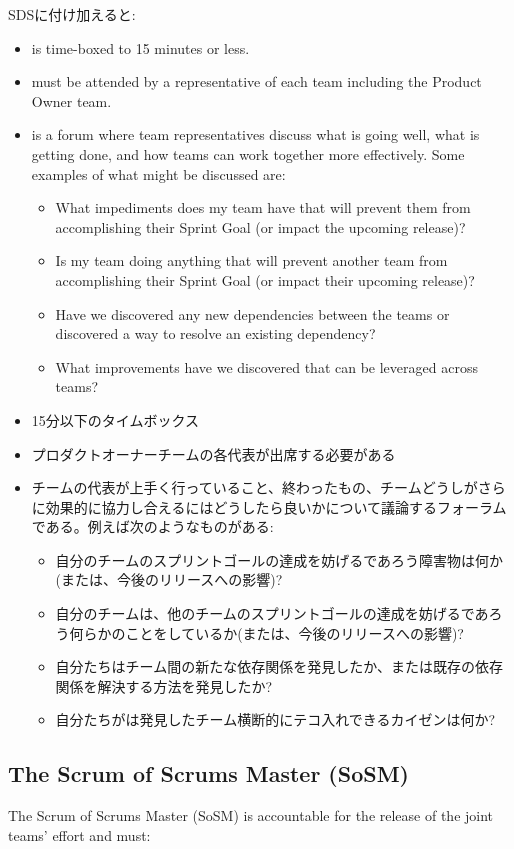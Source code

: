 \documentclass[12pt,a4paper,parskip=full]{scrartcl}
\begin{document}
SDSに付け加えると:
\begin{itemize}
\item is time-boxed to 15 minutes or less.
\item must be attended by a representative of each team including the Product Owner team.
\item is a forum where team representatives discuss what is going well, what is getting done, and how teams can work together more effectively. Some examples of what might be discussed are:
\begin{itemize}
\item What impediments does my team have that will prevent them from
accomplishing their Sprint Goal (or impact the upcoming release)?
\item Is my team doing anything that will prevent another team from
accomplishing their Sprint Goal (or impact their upcoming release)?
\item Have we discovered any new dependencies between the teams or
discovered a way to resolve an existing dependency?
\item What improvements have we discovered that can be leveraged across teams?
\end{itemize}
\end{itemize}
\fi
\begin{itemize}
\item 15分以下のタイムボックス
\item プロダクトオーナーチームの各代表が出席する必要がある
\item チームの代表が上手く行っていること、終わったもの、チームどうしがさらに効果的に協力し合えるにはどうしたら良いかについて議論するフォーラムである。例えば次のようなものがある:
\begin{itemize}
\item 自分のチームのスプリントゴールの達成を妨げるであろう障害物は何か(または、今後のリリースへの影響)?
\item 自分のチームは、他のチームのスプリントゴールの達成を妨げるであろう何らかのことをしているか(または、今後のリリースへの影響)?
\item 自分たちはチーム間の新たな依存関係を発見したか、または既存の依存関係を解決する方法を発見したか?
\item 自分たちがは発見したチーム横断的にテコ入れできるカイゼンは何か?
\end{itemize}
\end{itemize}

\subsection{The Scrum of Scrums Master (SoSM)}
The Scrum of Scrums Master (SoSM) is accountable for the release of the
joint teams' effort and must:
\fi
\end{document}

